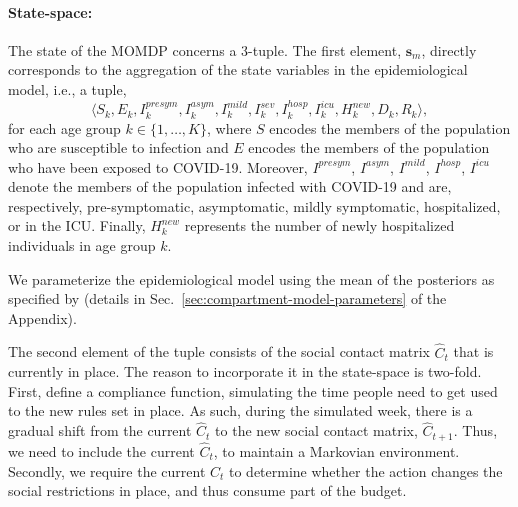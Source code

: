 \documentclass{article}
\newcommand{\mdpstate}{\mathbf{s}}
\newcommand{\momdpname}{MOBelCov}
\newcommand{\agegroups}{K}
\newcommand{\ltuple}{\langle}
\newcommand{\rtuple}{\rangle}
\begin{document}

\paragraph{State-space:} The state of the MOMDP concerns a 3-tuple. The first element, $\mdpstate_m$, directly corresponds to the aggregation of the state variables in the epidemiological model, i.e., a tuple,
\begin{equation}
    \ltuple S_k, E_k, I_k^{presym}, I_k^{asym}, I_k^{mild}, I_k^{sev}, I_k^{hosp}, I_k^{icu}, H^{new}_k, D_k, R_k \rtuple ,
\end{equation}
%
for each age group $k \in \{1, \ldots, \agegroups\}$, where $S$ encodes the members of the population who are susceptible to infection and $E$ encodes the members of the population who have been exposed to COVID-19. Moreover, $I^{presym}$, $I^{asym}$, $I^{mild}$, $I^{hosp}$, $I^{icu}$ denote the members of the population infected with COVID-19 and are, respectively, pre-symptomatic, asymptomatic, mildly symptomatic, hospitalized, or in the ICU. Finally, $H^{new}_k$ represents the number of newly hospitalized individuals in age group $k$.

We parameterize the epidemiological model using the mean of the posteriors as specified by \citet{abrams2021modelling} (details in Sec.~\ref{sec:compartment-model-parameters} of the Appendix).

The second element of the tuple consists of the social contact matrix $\hat{C}_t$ that is currently in place. The reason to incorporate it in the state-space is two-fold. First, \citet{abrams2021modelling} define a compliance function, simulating the time people need to get used to the new rules set in place. As such, during the simulated week, there is a gradual shift from the current $\hat{C}_t$ to the new social contact matrix, $\hat{C}_{t+1}$. Thus, we need to include the current $\hat{C}_t$, to maintain a Markovian environment. Secondly, we require the current $\hat{C}_t$ to determine whether the action changes the social restrictions in place, and thus consume part of the budget.
\end{document}

